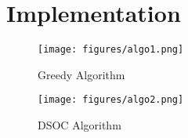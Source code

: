 \section{Implementation}


\begin{figure}
    \centering
    \texttt{[image: figures/algo1.png]}
    \caption{Greedy Algorithm}
    \label{fig:greedy}
\end{figure}

\begin{figure}
    \centering
    \texttt{[image: figures/algo2.png]}
    \caption{DSOC Algorithm}
    \label{fig:dsoc}
\end{figure}









